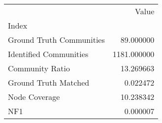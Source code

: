 \begin{tabular}{lr}
\toprule
{} &        Value \\
Index                    &              \\
\midrule
Ground Truth Communities &    89.000000 \\
Identified Communities   &  1181.000000 \\
Community Ratio          &    13.269663 \\
Ground Truth Matched     &     0.022472 \\
Node Coverage            &    10.238342 \\
NF1                      &     0.000007 \\
\bottomrule
\end{tabular}
